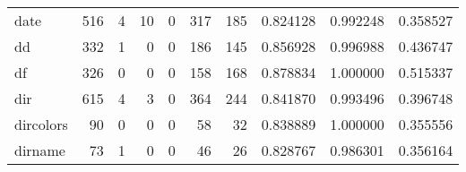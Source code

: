 \begin{tabular}{lrrrrrrrrr}
date      &                                   516 &                                                  4 &                                                 10 &                                                  0 &                                                317 &                                                185 &                                           0.824128 &                               0.992248 &                             0.358527 \\
dd        &                                   332 &                                                  1 &                                                  0 &                                                  0 &                                                186 &                                                145 &                                           0.856928 &                               0.996988 &                             0.436747 \\
df        &                                   326 &                                                  0 &                                                  0 &                                                  0 &                                                158 &                                                168 &                                           0.878834 &                               1.000000 &                             0.515337 \\
dir       &                                   615 &                                                  4 &                                                  3 &                                                  0 &                                                364 &                                                244 &                                           0.841870 &                               0.993496 &                             0.396748 \\
dircolors &                                    90 &                                                  0 &                                                  0 &                                                  0 &                                                 58 &                                                 32 &                                           0.838889 &                               1.000000 &                             0.355556 \\
dirname   &                                    73 &                                                  1 &                                                  0 &                                                  0 &                                                 46 &                                                 26 &                                           0.828767 &                               0.986301 &                             0.356164 \\

\end{tabular}
